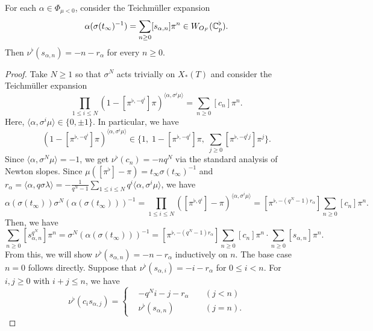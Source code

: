 \documentclass[12pt,reqno]{amsart}
\begin{document}
\begin{prop}\label{lem:valsalpha}
    For each $\alpha \in \Phi_{\mu<0}$, consider the Teichm\"{u}ller expansion
    \[
        \alpha(\sigma(t_\infty)^{-1}) = \sum_{n\geq 0} [s_{\alpha,n}]\pi^n \in W_{O_F}(\mathbb{C}_p^\flat).
    \] 
    Then $\nu^\flat(s_{\alpha,n}) = -n - r_\alpha$ for every $n \geq 0$. 
\end{prop}
\begin{proof}
    Take $N \geq 1$ so that $\sigma^N$ acts trivially on $X_*(T)$ and consider the Teichm\"{u}ller expansion 
    \[ 
        \prod_{1 \leq i \leq N} (1-[\pi^{\flat, -q^i}]\pi)^{\langle \alpha, \sigma^i \mu \rangle} = \sum_{n \geq 0} [c_n]\pi^n. 
    \] 
    Here, $\langle \alpha, \sigma^i \mu \rangle \in \{0, \pm 1\}$. In particular, we have
    \[
        (1-[\pi^{\flat, -q^i}]\pi)^{\langle \alpha, \sigma^i \mu \rangle} \in \bigl\{1,\; 1-[\pi^{\flat, -q^i}]\pi,\; \sum_{j \geq 0} [\pi^{\flat, -q^ij}]\pi^j \bigr\}. 
    \]
    Since $\langle \alpha, \sigma^N \mu \rangle = -1$, we get $\nu^\flat(c_n) = -nq^N$ via the standard analysis of Newton slopes. Since $\mu([\pi^\flat]-\pi) = t_\infty \sigma(t_\infty)^{-1}$ and $r_\alpha = \langle \alpha, q\sigma \lambda  \rangle = -\tfrac{1}{q^N-1}\sum_{1\leq i \leq N} q^i \langle \alpha, \sigma^i \mu \rangle$, we have
    \begin{equation} \label{eq:use_of_tinfty}
        \alpha(\sigma(t_\infty)) \sigma^N(\alpha(\sigma(t_\infty)))^{-1} = \prod_{1 \leq i \leq N} ([\pi^{\flat, q^i}]-\pi)^{\langle \alpha, \sigma^i \mu \rangle} = [\pi^{\flat, -(q^N-1)r_\alpha}] \sum_{n\geq 0} [c_n]\pi^n. 
    \end{equation} 
    Then, we have 
    \begin{equation*}
        \sum_{n\geq 0} [s_{\alpha,n}^{q^N}]\pi^n = \sigma^N(\alpha(\sigma(t_\infty)))^{-1} = [\pi^{\flat, -(q^N-1)r_\alpha}] \sum_{n\geq 0} [c_n]\pi^n \cdot \sum_{n\geq 0} [s_{\alpha,n}]\pi^n. \label{eq:salpha}
    \end{equation*}
    From this, we will show $\nu^\flat(s_{\alpha,n}) = -n - r_\alpha$ inductively on $n$. The base case $n=0$ follows directly. Suppose that $\nu^\flat(s_{\alpha,i}) = - i - r_\alpha$ for $0 \leq i < n$. For $i,j \geq 0$ with $i+j \leq n$, we have
    \begin{equation*}
        \nu^\flat(c_i s_{\alpha,j}) = \left\{ 
            \begin{alignedat}{3}
                & - q^N i - j - r_\alpha  & \; & (j < n) \\
                & \nu^\flat(s_{\alpha,n}) & \; & (j = n). 

\end{alignedat}
\end{equation*}
\end{proof}
\end{document}
